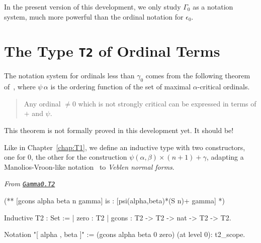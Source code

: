 {In the present version of this development, we  only study $\Gamma_0$ as a notation system, much more powerful than the ordinal notation for $\epsilon_0$.

%




\section{The Type \texttt{T2} of Ordinal Terms}

The notation system for ordinals less than $\gamma_0$ comes from the following theorem of~\cite{schutte}, where $\psi\,\alpha$ is the ordering function 
of the set of maximal $\alpha$-critical ordinals.


\begin{quote}
  Any ordinal $\not= 0$ which is not strongly critical can be expressed in terms of $+$ and $\psi$.
\end{quote}

\begin{project}
This theorem is not formally proved in this development yet. It should be!
\end{project}


Like in Chapter~\ref{chap:T1}, we define an inductive type with two constructors, one for $0$, the other for the construction $\psi(\alpha,\beta)\times(n+1)+\gamma$, adapting a Manolios-Vroon-like notation~\cite{Manolios2005} to
\emph{Veblen normal forms}.
\label{types:T2}

\noindent\emph{From \href{../theories/html/hydras.Gamma0.T2.html\#T2}%
{\texttt{Gamma0.T2}}}
\begin{Coqsrc}
(**  [gcons alpha beta n gamma] is : [psi(alpha,beta)*(S n)+ gamma]  *)

Inductive T2 : Set :=
| zero : T2
| gcons : T2 -> T2  -> nat -> T2 -> T2.

Notation "[ alpha , beta ]" := (gcons alpha beta 0 zero)
                                 (at level 0): t2_scope.
\end{Coqsrc}

}

